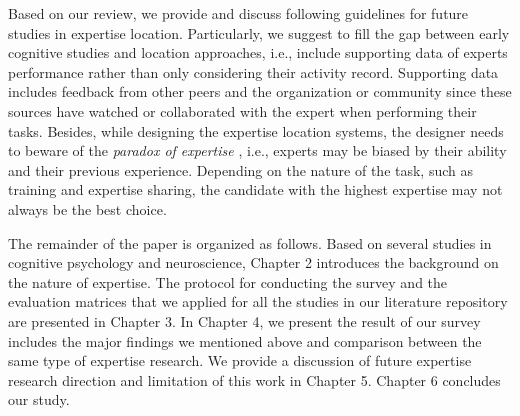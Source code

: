 Based on our review, we provide and discuss following guidelines for future studies in expertise location. Particularly, we suggest to fill the gap between early cognitive studies and location approaches, i.e., include supporting data of experts performance rather than only considering their activity record. Supporting data includes feedback from other peers and the organization or community since these sources have watched or collaborated with the expert when performing their tasks. Besides, while designing the expertise location systems, the designer needs to beware of the \textit{paradox of expertise} \cite{dror2011paradox}, i.e., experts may be biased by their ability and their previous experience. Depending on the nature of the task, such as training and expertise sharing, the candidate with the highest expertise may not always be the best choice.

The remainder of the paper is organized as follows. Based on several studies in cognitive psychology and neuroscience, Chapter 2 introduces the background on the nature of expertise. The protocol for conducting the survey and the evaluation matrices that we applied for all the studies in our literature repository are presented in Chapter 3. In Chapter 4, we present the result of our survey includes the major findings we mentioned above and comparison between the same type of expertise research. We provide a discussion of future expertise research direction and limitation of this work in Chapter 5. Chapter 6 concludes our study.




